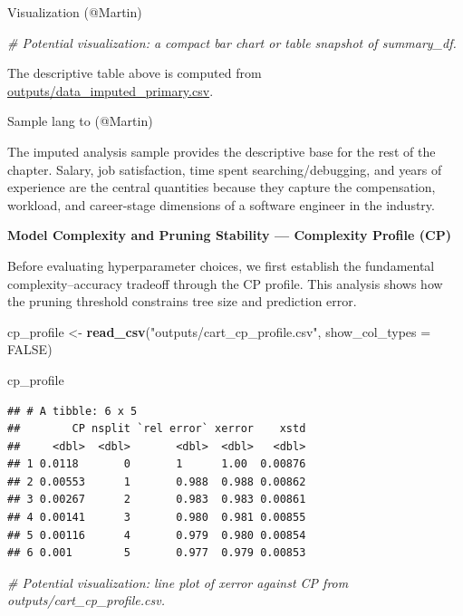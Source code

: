\documentclass[
]{article}
\newenvironment{Shaded}{\begin{snugshade}}{\end{snugshade}}
\newcommand{\AttributeTok}[1]{\textcolor[rgb]{0.13,0.29,0.53}{#1}}
\newcommand{\CommentTok}[1]{\textcolor[rgb]{0.56,0.35,0.01}{\textit{#1}}}
\newcommand{\ConstantTok}[1]{\textcolor[rgb]{0.56,0.35,0.01}{#1}}
\newcommand{\FunctionTok}[1]{\textcolor[rgb]{0.13,0.29,0.53}{\textbf{#1}}}
\newcommand{\NormalTok}[1]{#1}
\newcommand{\OtherTok}[1]{\textcolor[rgb]{0.56,0.35,0.01}{#1}}
\newcommand{\StringTok}[1]{\textcolor[rgb]{0.31,0.60,0.02}{#1}}
\begin{document}
Visualization (@Martin)

\begin{Shaded}
\begin{Highlighting}[]
\CommentTok{\# Potential visualization: a compact bar chart or table snapshot of summary\_df.}
\end{Highlighting}
\end{Shaded}

The descriptive table above is computed from
\url{outputs/data_imputed_primary.csv}.

Sample lang to (@Martin)

The imputed analysis sample provides the descriptive base for the rest
of the chapter. Salary, job satisfaction, time spent
searching/debugging, and years of experience are the central quantities
because they capture the compensation, workload, and career-stage
dimensions of a software engineer in the industry.

\textbf{Model Complexity and Pruning Stability --- Complexity Profile
(CP)}

Before evaluating hyperparameter choices, we first establish the
fundamental complexity--accuracy tradeoff through the CP profile. This
analysis shows how the pruning threshold constrains tree size and
prediction error.

\begin{Shaded}
\begin{Highlighting}[]
\NormalTok{cp\_profile }\OtherTok{\textless{}{-}} \FunctionTok{read\_csv}\NormalTok{(}\StringTok{"outputs/cart\_cp\_profile.csv"}\NormalTok{, }\AttributeTok{show\_col\_types =} \ConstantTok{FALSE}\NormalTok{)}

\NormalTok{cp\_profile}
\end{Highlighting}
\end{Shaded}

\begin{verbatim}
## # A tibble: 6 x 5
##        CP nsplit `rel error` xerror    xstd
##     <dbl>  <dbl>       <dbl>  <dbl>   <dbl>
## 1 0.0118       0       1      1.00  0.00876
## 2 0.00553      1       0.988  0.988 0.00862
## 3 0.00267      2       0.983  0.983 0.00861
## 4 0.00141      3       0.980  0.981 0.00855
## 5 0.00116      4       0.979  0.980 0.00854
## 6 0.001        5       0.977  0.979 0.00853
\end{verbatim}

\begin{Shaded}
\begin{Highlighting}[]
\CommentTok{\# Potential visualization: line plot of xerror against CP from outputs/cart\_cp\_profile.csv.}
\end{Highlighting}
\end{Shaded}
\end{document}

